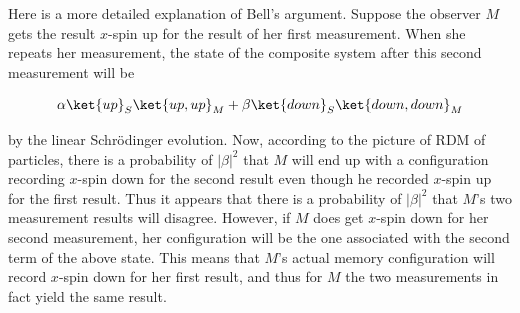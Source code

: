 Here is a more detailed explanation of Bell's argument. %
Suppose the observer $M$ gets the result $x$-spin up for the result of her first measurement. When she repeats her measurement, the state of the composite system after this second measurement will be

\begin{equation}
\alpha \ket{up}_S \ket{up,up}_M+\beta \ket{down}_S \ket{down,down}_M
\label{}
\end{equation}

\noindent by the linear Schr\"{o}dinger evolution. Now, according to the picture of RDM of particles,  there is a probability of $|\beta|^2$ that $M$ will end up with a configuration recording $x$-spin down for the second result even though he recorded $x$-spin up for the first result. Thus it appears that there is a probability of $|\beta|^2$ that $M$'s two measurement results will disagree.
However, if $M$ does get $x$-spin down for her second measurement, her configuration will be the one associated with the second term of the above state. This means that $M$'s actual memory configuration will record $x$-spin down for her first result, and thus for $M$ the two measurements in fact yield the same result. %


